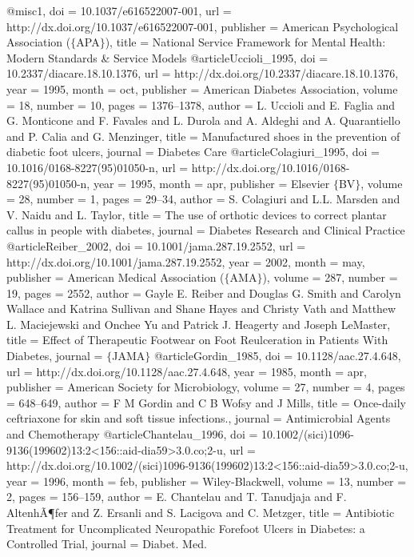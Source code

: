 @misc{1,
	doi = {10.1037/e616522007-001},
	url = {http://dx.doi.org/10.1037/e616522007-001},
	publisher = {American Psychological Association ($\lbrace$APA$\rbrace$)},
	title = {National Service Framework for Mental Health: Modern Standards {\&} Service Models}
}
@article{Uccioli_1995,
	doi = {10.2337/diacare.18.10.1376},
	url = {http://dx.doi.org/10.2337/diacare.18.10.1376},
	year = 1995,
	month = {oct},
	publisher = {American Diabetes Association},
	volume = {18},
	number = {10},
	pages = {1376--1378},
	author = {L. Uccioli and E. Faglia and G. Monticone and F. Favales and L. Durola and A. Aldeghi and A. Quarantiello and P. Calia and G. Menzinger},
	title = {Manufactured shoes in the prevention of diabetic foot ulcers},
	journal = {Diabetes Care}
}
@article{Colagiuri_1995,
	doi = {10.1016/0168-8227(95)01050-n},
	url = {http://dx.doi.org/10.1016/0168-8227(95)01050-n},
	year = 1995,
	month = {apr},
	publisher = {Elsevier $\lbrace$BV$\rbrace$},
	volume = {28},
	number = {1},
	pages = {29--34},
	author = {S. Colagiuri and L.L. Marsden and V. Naidu and L. Taylor},
	title = {The use of orthotic devices to correct plantar callus in people with diabetes},
	journal = {Diabetes Research and Clinical Practice}
}
@article{Reiber_2002,
	doi = {10.1001/jama.287.19.2552},
	url = {http://dx.doi.org/10.1001/jama.287.19.2552},
	year = 2002,
	month = {may},
	publisher = {American Medical Association ($\lbrace$AMA$\rbrace$)},
	volume = {287},
	number = {19},
	pages = {2552},
	author = {Gayle E. Reiber and Douglas G. Smith and Carolyn Wallace and Katrina Sullivan and Shane Hayes and Christy Vath and Matthew L. Maciejewski and Onchee Yu and Patrick J. Heagerty and Joseph LeMaster},
	title = {Effect of Therapeutic Footwear on Foot Reulceration in Patients With Diabetes},
	journal = {$\lbrace$JAMA$\rbrace$}
}
@article{Gordin_1985,
	doi = {10.1128/aac.27.4.648},
	url = {http://dx.doi.org/10.1128/aac.27.4.648},
	year = 1985,
	month = {apr},
	publisher = {American Society for Microbiology},
	volume = {27},
	number = {4},
	pages = {648--649},
	author = {F M Gordin and C B Wofsy and J Mills},
	title = {Once-daily ceftriaxone for skin and soft tissue infections.},
	journal = {Antimicrobial Agents and Chemotherapy}
}
@article{Chantelau_1996,
	doi = {10.1002/(sici)1096-9136(199602)13:2<156::aid-dia59>3.0.co;2-u},
	url = {http://dx.doi.org/10.1002/(sici)1096-9136(199602)13:2<156::aid-dia59>3.0.co;2-u},
	year = 1996,
	month = {feb},
	publisher = {Wiley-Blackwell},
	volume = {13},
	number = {2},
	pages = {156--159},
	author = {E. Chantelau and T. Tanudjaja and F. AltenhÃ¶fer and Z. Ersanli and S. Lacigova and C. Metzger},
	title = {Antibiotic Treatment for Uncomplicated Neuropathic Forefoot Ulcers in Diabetes: a Controlled Trial},
	journal = {Diabet. Med.}
}
